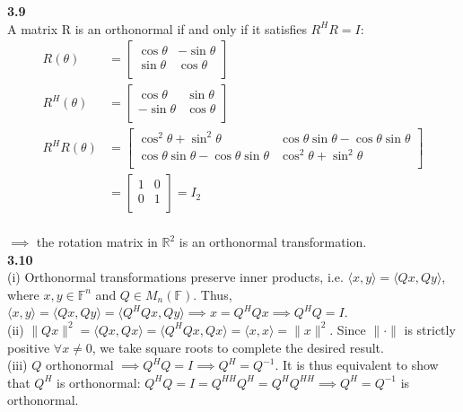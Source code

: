 \documentclass[letterpaper,12pt]{article}
\theoremstyle{definition}
\begin{document}
\noindent\textbf{3.9}\\
A matrix R is an orthonormal if and only if it satisfies $R^HR = I$:
\begin{align*}
R(\theta) &= \begin{bmatrix}
	\cos\theta & -\sin\theta \\
	\sin\theta & \cos\theta \\
\end{bmatrix}\\
R^H(\theta) &= \begin{bmatrix}
	\cos\theta & \sin\theta \\
	-\sin\theta & \cos\theta \\
\end{bmatrix}\\
R^HR(\theta) &= \begin{bmatrix}
	\cos^2\theta + \sin^2\theta & \cos\theta\sin\theta - \cos\theta\sin\theta \\
	\cos\theta\sin\theta - \cos\theta\sin\theta & \cos^2\theta + \sin^2\theta \\
\end{bmatrix}\\
&= \begin{bmatrix}
	1 & 0\\
	0 & 1\\
\end{bmatrix}
= I_2
\end{align*}\\
$\implies$ the rotation matrix in $\mathbb{R}^2$ is an orthonormal transformation.\\

\noindent\textbf{3.10}\\
(i) Orthonormal transformations preserve inner products, i.e. $\langle x,y \rangle = \langle Qx, Qy \rangle$, where $x,y\in\mathbb{F}^n$ and $Q \in M_n(\mathbb{F})$. Thus, $\langle x,y \rangle = \langle Qx, Qy \rangle = \langle Q^HQx, Qy \rangle \implies x = Q^HQx \implies Q^HQ = I$.\\

\noindent(ii) $\|Qx\|^2 = \langle Qx, Qx \rangle = \langle Q^HQx, Qx \rangle = \langle x,x \rangle = \|x\|^2.$ Since $\| \cdot \|$ is strictly positive $\forall x \neq 0$, we take square roots to complete the desired result.\\

\noindent(iii) $Q$ orthonormal $\implies Q^HQ = I \implies Q^H = Q^{-1}$. It is thus equivalent to show that $Q^H$ is orthonormal: $Q^HQ = I =  Q^{HH}Q^H = Q^HQ^{HH} \implies Q^H = Q^{-1}$ is orthonormal.\\
\end{document}
